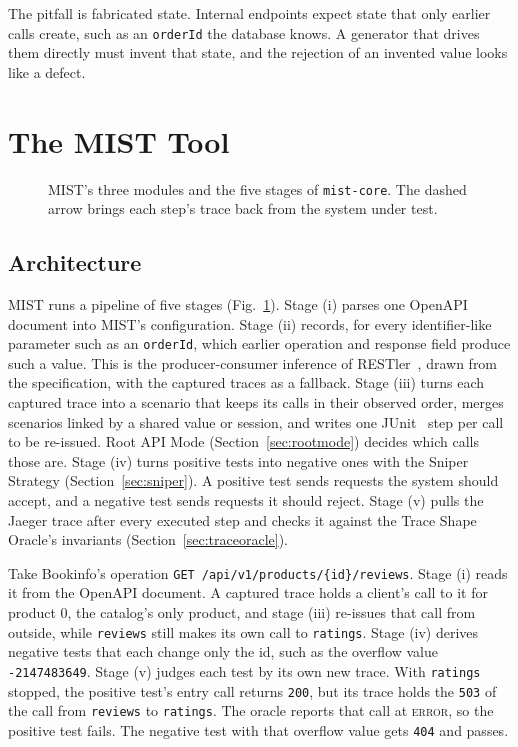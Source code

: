 \documentclass[10pt,conference]{IEEEtran}
\begin{document}
The pitfall is fabricated state. Internal endpoints expect state that only earlier calls create, such as an \texttt{orderId} the database knows. A generator that drives them directly must invent that state, and the rejection of an invented value looks like a defect.

\section{The MIST Tool}\label{sec:tool}

\begin{figure}[t]
  \centering
  \resizebox{\textwidth}{!}{}
  \caption{MIST's three modules and the five stages of \texttt{mist-core}. The dashed arrow brings each step's trace back from the system under test.}
  \label{fig:arch}
\end{figure}

\subsection{Architecture}\label{sec:arch}

MIST runs a pipeline of five stages (Fig.~\ref{fig:arch}). Stage (i) parses one OpenAPI document into MIST's configuration. Stage (ii) records, for every identifier-like parameter such as an \texttt{orderId}, which earlier operation and response field produce such a value. This is the producer-consumer inference of RESTler~\cite{Atlidakis2019RESTler}, drawn from the specification, with the captured traces as a fallback. Stage (iii) turns each captured trace into a scenario that keeps its calls in their observed order, merges scenarios linked by a shared value or session, and writes one JUnit~\cite{JUnit4} step per call to be re-issued. Root API Mode (Section~\ref{sec:rootmode}) decides which calls those are. Stage (iv) turns positive tests into negative ones with the Sniper Strategy (Section~\ref{sec:sniper}). A positive test sends requests the system should accept, and a negative test sends requests it should reject. Stage (v) pulls the Jaeger trace after every executed step and checks it against the Trace Shape Oracle's invariants (Section~\ref{sec:traceoracle}).

Take Bookinfo's operation \texttt{GET /api/\allowbreak v1/\allowbreak products/\allowbreak\{id\}/\allowbreak reviews}. Stage (i) reads it from the OpenAPI document. A captured trace holds a client's call to it for product 0, the catalog's only product, and stage (iii) re-issues that call from outside, while \texttt{reviews} still makes its own call to \texttt{ratings}. Stage (iv) derives negative tests that each change only the id, such as the overflow value \texttt{-2147483649}. Stage (v) judges each test by its own new trace. With \texttt{ratings} stopped, the positive test's entry call returns \texttt{200}, but its trace holds the \texttt{503} of the call from \texttt{reviews} to \texttt{ratings}. The oracle reports that call at \textsc{error}, so the positive test fails. The negative test with that overflow value gets \texttt{404} and passes.
\end{document}
